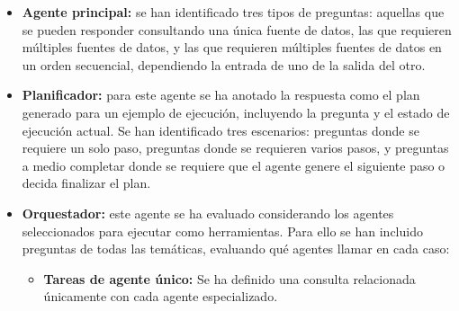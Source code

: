 \begin{itemize}
\item\textbf{Agente principal: }se han identificado tres tipos de preguntas: aquellas que se pueden responder consultando una única fuente de datos, las que requieren múltiples fuentes de datos, y las que requieren múltiples fuentes de datos en un orden secuencial, dependiendo la entrada de uno de la salida del otro.

\item\textbf{Planificador: }para este agente se ha anotado la respuesta como el plan generado para un ejemplo de ejecución, incluyendo la pregunta y el estado de ejecución actual. Se han identificado tres escenarios: preguntas donde se requiere un solo paso, preguntas donde se requieren varios pasos, y preguntas a medio completar donde se requiere que el agente genere el siguiente paso o decida finalizar el plan.

\item\textbf{Orquestador: }este agente se ha evaluado considerando los agentes seleccionados para ejecutar como herramientas. Para ello se han incluido preguntas de todas las temáticas, evaluando qué agentes llamar en cada caso:

\begin{itemize}
\item \textbf{Tareas de agente único: }Se ha definido una consulta relacionada únicamente con cada agente especializado.


\end{itemize}
\end{itemize}
